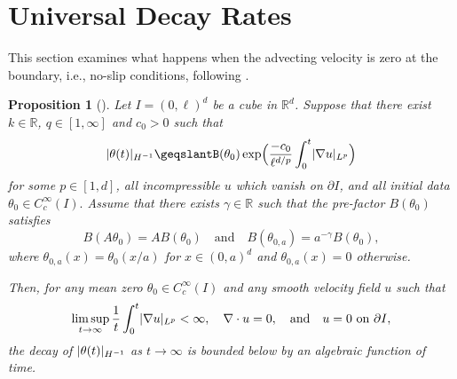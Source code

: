 \documentclass[12pt]{report}   %
\renewcommand{\geq}{\geqslant}
\newcommand{\grad}{\nabla}
\numberwithin{equation}{section}
\theoremstyle{plain}
\newtheorem{proposition}[lemma]{Proposition}
\theoremstyle{definition}
\theoremstyle{remark}
\DeclarePairedDelimiter{\norm}{|}{|}
\DeclarePairedDelimiter{\paren}{(}{)}
\newcommand{\del}{\partial}
\begin{document}
\section{ Universal Decay Rates}
This section examines what happens when the advecting velocity is zero at the boundary, i.e., no-slip conditions, following \cite{IyerKiselevEA14}.
  \begin{proposition}[{\cite[Proposition~3.1]{IyerKiselevEA14}}]\label{boundaries}
    Let $I = (0, \ell)^d$ be a cube in $\mathbb R^d$.
    Suppose that there exist $k\in \mathbb R$, $q \in [1, \infty]$ and $c_0 > 0$ %
    such that
    \begin{equation}\label{eqnULowerBd}
      \norm{\theta(t)}_{H^{-1}}
	\geq %
	B(\theta_0)  \exp\paren[\Big]{ \frac{-c_0}{\ell^{d/p}} \int_0^t \norm{\grad u}_{L^p} }
    \end{equation}
    for some $p \in [1, d]$, all incompressible $u$ which vanish on $\del I$, and all initial data $\theta_0 \in C_c^\infty(I).$
    Assume that there exists $\gamma \in \mathbb R$ such that the pre-factor $B(\theta_0)$ satisfies
    \[
      B(A\theta_0)= AB(\theta_0)
      \quad\text{and}\quad
      B(\theta_{0,a})= a^{-\gamma} B(\theta_0),
    \]
    where $\theta_{0,a}(x) = \theta_0(x/a)$ for $x \in (0,a)^d$ and $\theta_{0,a}(x) = 0$ otherwise.

    Then, for any mean zero $\theta_0 \in C_c^\infty(I)$ and any smooth velocity field $u$ such that
    \[
      \limsup_{t \to \infty} \frac{1}{t} \int_0^t \norm{\grad u}_{L^p} <  \infty,
      \quad \grad \cdot u = 0,
      \quad\text{and}\quad u = 0 \text{ on } \del I,
    \]
    the decay of $\norm{\theta(t)}_{H^{-1}}$ as $t \to \infty$ is bounded below by an algebraic function of time.
  \end{proposition}
\end{document}
